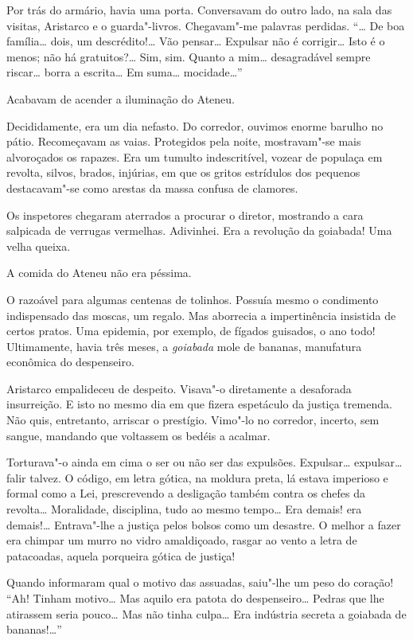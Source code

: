 Por trás do armário, havia uma porta.
Conversavam do outro lado, na sala das visitas, Aristarco e o
guarda"-livros. Chegavam"-me palavras perdidas. ``\ldots{} De boa família\ldots{}
dois, um descrédito!\ldots{} Vão pensar\ldots{} Expulsar não é corrigir\ldots{} Isto é
o menos; não há gratuitos?\ldots{} Sim, sim. Quanto a mim\ldots{} desagradável
sempre riscar\ldots{} borra a escrita\ldots{} Em suma\ldots{} mocidade\ldots{}'' 

Acabavam de acender a iluminação do Ateneu. 

Decididamente, era um dia nefasto. Do corredor, ouvimos enorme barulho no pátio. 
Recomeçavam as vaias. Protegidos pela noite, mostravam"-se mais alvoroçados 
os rapazes. Era um tumulto indescritível, vozear de populaça em revolta, silvos,
brados, injúrias, em que os gritos estrídulos dos pequenos
destacavam"-se como arestas da massa confusa de clamores. 

Os inspetores chegaram aterrados a procurar o diretor, mostrando a cara
salpicada de verrugas vermelhas. Adivinhei. Era a revolução da
goiabada! Uma velha queixa. 

A comida do Ateneu não era péssima. 

O razoável para algumas centenas de tolinhos. Possuía mesmo o condimento
indispensado das moscas, um regalo. Mas aborrecia a impertinência
insistida de certos pratos. Uma epidemia, por exemplo, de fígados
guisados, o ano todo! Ultimamente, havia três meses, a \textit{goiabada} mole de
bananas, manufatura econômica do despenseiro. 

Aristarco empalideceu de despeito. Visava"-o diretamente a desaforada insurreição. 
E isto no mesmo dia em que fizera espetáculo da justiça tremenda. Não quis,
entretanto, arriscar o prestígio. Vimo"-lo no corredor, incerto, sem
sangue, mandando que voltassem os bedéis a acalmar. 

Torturava"-o ainda
em cima o ser ou não ser das expulsões. Expulsar\ldots{} expulsar\ldots{} falir
talvez. O código, em letra gótica, na moldura preta, lá estava
imperioso e formal como a Lei, prescrevendo a desligação também contra
os chefes da revolta\ldots{} Moralidade, disciplina, tudo ao mesmo tempo\ldots{}
Era demais! era demais!\ldots{} Entrava"-lhe a justiça pelos bolsos como um
desastre. O melhor a fazer era chimpar um murro no vidro amaldiçoado,
rasgar ao vento a letra de patacoadas, aquela porqueira gótica de justiça! 


Quando informaram qual o motivo das assuadas, saiu"-lhe um
peso do coração! ``Ah! Tinham motivo\ldots{} Mas aquilo era patota do
despenseiro\ldots{} Pedras que lhe atirassem seria pouco\ldots{} Mas não tinha
culpa\ldots{} Era indústria secreta a goiabada de bananas!\ldots{}'' 

